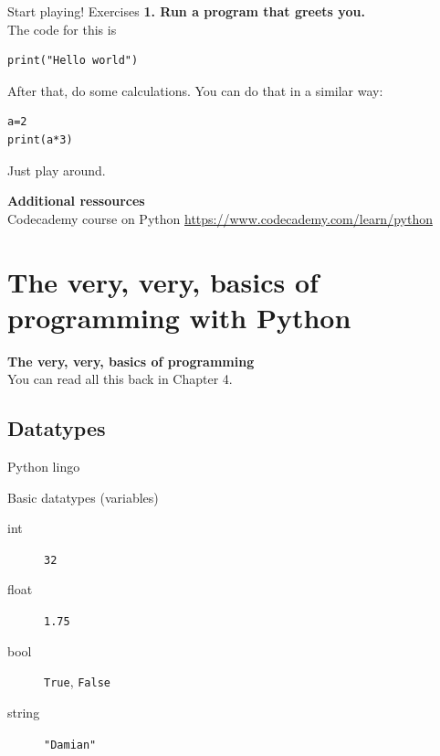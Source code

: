 \documentclass{beamer}
\begin{document}
\begin{frame}[fragile]{Start playing!}
Exercises 
\vspace{.5cm}
\textbf{1. Run a program that greets you.}\\
The code for this is 
\begin{lstlisting}
print("Hello world")
\end{lstlisting}
After that, do some calculations. You can do that in a similar way:
\begin{lstlisting}
a=2
print(a*3)
\end{lstlisting}
Just play around.

\vspace{.5cm}
\textbf{Additional ressources}\\
Codecademy course on Python
\url{https://www.codecademy.com/learn/python}

\end{frame}







\section[Basics]{The very, very, basics of programming with Python}
\begin{frame}[plain]
\textbf{The very, very, basics of programming}\\
\vspace{1cm}
You can read all this back in Chapter 4.
\end{frame}
\subsection{Datatypes}


\begin{frame}{Python lingo}
\begin{block}{Basic datatypes (variables)}
\begin{description}
\item[{\color{red}int}] \texttt{32}
\item[{\color{red}float}] \texttt{1.75}
\item[{\color{red}bool}] \texttt{True}, \texttt{False}
\item[{\color{red}string}] \texttt{"Damian"}
\end{description}
\end{block}
\\
\end{frame}
\end{document}
